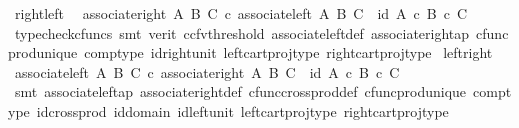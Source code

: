 \begin{isabellebody}
%
\endisatagproof
{\isafoldproof}%
%
\isadelimproof
\isanewline
%
\endisadelimproof
\isanewline
{}\isamarkupfalse%
\ right{\isacharunderscore}{\kern0pt}left{\isacharcolon}{\kern0pt}\ \isanewline
\ {\isachardoublequoteopen}associate{\isacharunderscore}{\kern0pt}right\ A\ B\ C\ {\isasymcirc}\isactrlsub c\ associate{\isacharunderscore}{\kern0pt}left\ A\ B\ C\ {\isacharequal}{\kern0pt}\ id\ {\isacharparenleft}{\kern0pt}A\ {\isasymtimes}\isactrlsub c\ {\isacharparenleft}{\kern0pt}B\ {\isasymtimes}\isactrlsub c\ C{\isacharparenright}{\kern0pt}{\isacharparenright}{\kern0pt}{\isachardoublequoteclose}\isanewline
%
\isadelimproof
\ \ %
\endisadelimproof
%
\isatagproof
{}\isamarkupfalse%
\ {\isacharparenleft}{\kern0pt}typecheck{\isacharunderscore}{\kern0pt}cfuncs{\isacharcomma}{\kern0pt}\ smt\ {\isacharparenleft}{\kern0pt}verit{\isacharcomma}{\kern0pt}\ ccfv{\isacharunderscore}{\kern0pt}threshold{\isacharparenright}{\kern0pt}\ associate{\isacharunderscore}{\kern0pt}left{\isacharunderscore}{\kern0pt}def\ associate{\isacharunderscore}{\kern0pt}right{\isacharunderscore}{\kern0pt}ap\ cfunc{\isacharunderscore}{\kern0pt}prod{\isacharunderscore}{\kern0pt}unique\ comp{\isacharunderscore}{\kern0pt}type\ id{\isacharunderscore}{\kern0pt}right{\isacharunderscore}{\kern0pt}unit{}\ left{\isacharunderscore}{\kern0pt}cart{\isacharunderscore}{\kern0pt}proj{\isacharunderscore}{\kern0pt}type\ right{\isacharunderscore}{\kern0pt}cart{\isacharunderscore}{\kern0pt}proj{\isacharunderscore}{\kern0pt}type{\isacharparenright}{\kern0pt}%
\endisatagproof
{\isafoldproof}%
%
\isadelimproof
\isanewline
%
\endisadelimproof
\isanewline
{}\isamarkupfalse%
\ left{\isacharunderscore}{\kern0pt}right{\isacharcolon}{\kern0pt}\ \isanewline
\ {\isachardoublequoteopen}associate{\isacharunderscore}{\kern0pt}left\ A\ B\ C\ {\isasymcirc}\isactrlsub c\ associate{\isacharunderscore}{\kern0pt}right\ A\ B\ C\ {\isacharequal}{\kern0pt}\ id\ {\isacharparenleft}{\kern0pt}{\isacharparenleft}{\kern0pt}A\ {\isasymtimes}\isactrlsub c\ B{\isacharparenright}{\kern0pt}\ {\isasymtimes}\isactrlsub c\ C{\isacharparenright}{\kern0pt}{\isachardoublequoteclose}\isanewline
%
\isadelimproof
\ \ \ \ %
\endisadelimproof
%
\isatagproof
{}\isamarkupfalse%
\ {\isacharparenleft}{\kern0pt}smt\ associate{\isacharunderscore}{\kern0pt}left{\isacharunderscore}{\kern0pt}ap\ associate{\isacharunderscore}{\kern0pt}right{\isacharunderscore}{\kern0pt}def\ cfunc{\isacharunderscore}{\kern0pt}cross{\isacharunderscore}{\kern0pt}prod{\isacharunderscore}{\kern0pt}def\ cfunc{\isacharunderscore}{\kern0pt}prod{\isacharunderscore}{\kern0pt}unique\ comp{\isacharunderscore}{\kern0pt}type\ id{\isacharunderscore}{\kern0pt}cross{\isacharunderscore}{\kern0pt}prod\ id{\isacharunderscore}{\kern0pt}domain\ id{\isacharunderscore}{\kern0pt}left{\isacharunderscore}{\kern0pt}unit{}\ left{\isacharunderscore}{\kern0pt}cart{\isacharunderscore}{\kern0pt}proj{\isacharunderscore}{\kern0pt}type\ right{\isacharunderscore}{\kern0pt}cart{\isacharunderscore}{\kern0pt}proj{\isacharunderscore}{\kern0pt}type{\isacharparenright}{\kern0pt}%

\end{isabellebody}

